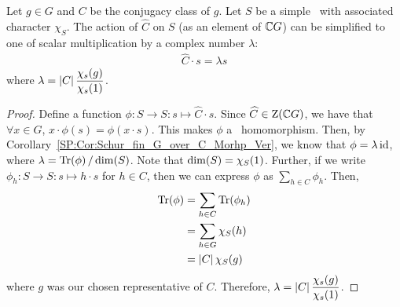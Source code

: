 \begin{lemma}\label{Ch2:Lem:Scalar_Action_Alg_Int}
    Let $g \in G$ and $C$ be the conjugacy class of $g$.
    Let $S$ be a simple \CGM\ with associated character $\chi_S$. The action of $\hat{C}$ on $S$ (as an element of $\mathbb{C} G$) can be simplified to one of scalar multiplication by a complex number $\lambda$:
    \begin{align*}
        \hat{C} \cdot s = \lambda s
    \end{align*}
    where $\displaystyle \lambda %
    = \abs{C} \frac{\chi_s(g)}{\chi_s(1)}$.
\end{lemma}
\begin{proof}
    Define a function $\phi : S \to S : s \mapsto \hat{C} \cdot s$. Since $\widehat{C} \in \operatorname{Z}\!\left( \mathbb{C} G \right)$, we have that $\forall x \in G$, $x \cdot \phi(s) = \phi(x \cdot s)$. This makes $\phi$ a \CGM\ homomorphism. Then, by Corollary~\ref{SP:Cor:Schur_fin_G_over_C_Morhp_Ver}, we know that $\phi = \lambda \operatorname{id}$, where $\lambda = \operatorname{Tr}\!\left( \phi \right) / \dim\!\left( S \right)$. Note that $\dim\!\left( S \right) = \chi_{S}\!\left( 1 \right)$. Further, if we write $\phi_h : S \to S : s \mapsto h \cdot s$ for $h \in C$, then we can express $\phi$ as $\sum_{h \in C} \phi_h$. Then,
    \begin{align*}
        \operatorname{Tr}\!\left( \phi \right) &= \sum_{h \in C} \operatorname{Tr}\!\left( \phi_h \right) \\
        &= \sum_{h \in G} \chi_{S}\!\left( h \right) \\
        &= \left\lvert C \right\rvert \chi_{S}\!\left( g \right)
    \end{align*}
    where $g$ was our chosen representative of $C$. Therefore, $\displaystyle \lambda = \left\lvert C \right\rvert \frac{\chi_s(g)}{\chi_s(1)}$.
\end{proof}

